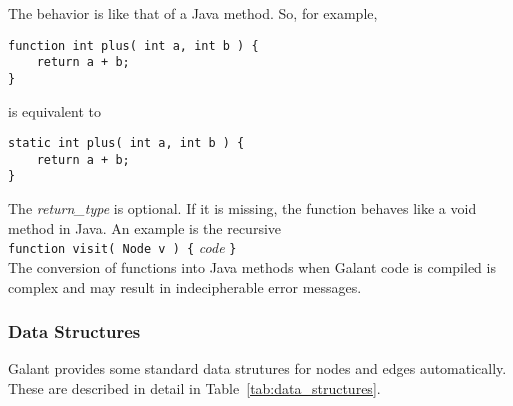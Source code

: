 The behavior is like that of a Java method. So, for example,
\begin{verbatim}
function int plus( int a, int b ) {
    return a + b;
}
\end{verbatim}
is equivalent to
\begin{verbatim}
static int plus( int a, int b ) {
    return a + b;
}
\end{verbatim}

The \textsl{return\_type} is optional. If it is missing, the function behaves like
a \textsf{void} method in Java. An example is the recursive
\\
\texttt{function visit( Node v ) \{} \textsl{code} \texttt{\}}
\\
The conversion of functions into Java methods when Galant code is compiled
is complex and may result in indecipherable error messages.



\subsubsection{Data Structures}

Galant provides some standard data strutures for nodes and edges automatically.
These are described in detail in Table~\ref{tab:data_structures}.

